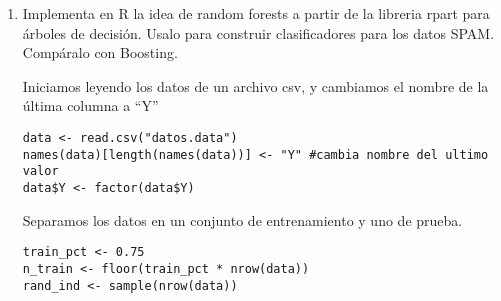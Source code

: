 \documentclass{article}
\begin{document}
\begin{enumerate}
Podemos usar 

$$p(x_i, y_i) = \pi{x_i}^{(y_i+1)/2} (1-\pi{x_i})^{ (1 - y_i)/2}$$

Con esto tenemos la función de verosimilitud ($L$) y log-verosimilitud ($l$)
\begin{align*}
L &= \prod_{i=1}^{n} \pi{x_i}^{(y_i+1)/2} (1-\pi{x_i})^{ (1 - y_i)/2}\\
l &= \log(\prod_{i=1}^{n} \pi{x_i}^{(y_i+1)/2} (1-\pi{x_i})^{ (1 - y_i)/2})\\
l &= \sum_{i=1}^{n} \log(\pi{x_i}^{(y_i+1)/2} (1-\pi{x_i})^{ (1 - y_i)/2})\\
l &= \sum_{i=1}^{n} \frac{y_i+1}{2}\log(\pi{x_i})+ \frac{1 - y_i}{2}\log(1-\pi{x_i}) \\
l &= \frac{1}{2}\sum_{i=1}^{n} (y_i+1)\log\left(\frac{1}{1+\exp[-f(x_i)]}\right)+ (1-y_i)\log\left(\frac{1}{1+\exp[f(x_i)]}\right)
\end{align*}
Cuando $y_i=1$
$$l = \sum_{i=1}^{n} \log\frac{1}{1+\exp[-f(x_i)]}$$
Cuando $y_i=-1$
$$l = \sum_{i=1}^{n} \log\frac{1}{1+\exp[f(x_i)]}$$
Por lo que podemos simplificar a
$$l = \sum_{i=1}^{n} \log\frac{1}{1+\exp[-y_if(x_i))}$$

Podemos graficar nuestra función de costo y comparar con \emph{Boosting} y \emph{SVM}. Las funciones son:

\begin{itemize}
  \item \textbf{Regresión:} $C(x, y) = \log(1+\exp[-yf(x)])$
  \item \textbf{Boosting:} $C(x, y) =\exp[-yf(x)]$
  \item \textbf{SVM:} $C(x, y) = \max(0, 1 - yf(x))$
\end{itemize}

\begin{center}
  \centering
  \texttt{[image: penal.png]}
\end{center}

Notamos que todos los métodos penaliza cuando se está clasificando bien, con SVM siendo el que menos penaliza y no penaliza despues de cierto punto. Por otra parte notamos que regresión es la función que menos incrementa con las malas penalizaciones.
\newpage

\item Implementa en R la idea de random forests a partir de la libreria rpart para árboles de decisión. Usalo para construir clasificadores para los datos SPAM. Compáralo con Boosting.

Iniciamos leyendo los datos de un archivo csv, y cambiamos el nombre de la última columna a ``Y''
\begin{lstlisting}
data <- read.csv("datos.data")
names(data)[length(names(data))] <- "Y" #cambia nombre del ultimo valor
data$Y <- factor(data$Y)
\end{lstlisting}
Separamos los datos en un conjunto de entrenamiento y uno de prueba.
\begin{lstlisting}
train_pct <- 0.75
n_train <- floor(train_pct * nrow(data))
rand_ind <- sample(nrow(data))


\end{lstlisting}
\end{enumerate}
\end{document}
